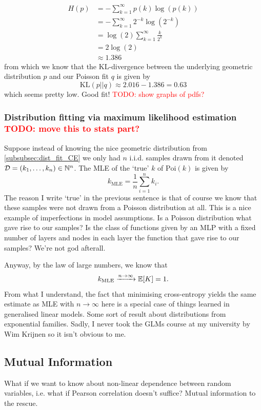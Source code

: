 \documentclass[11pt]{article}
\begin{document}
\begin{appendices}
\begin{align*}
    H(p)
    &=
    -\sum_{k=1}^{\infty}p(k)\log(p(k))\\
    &=
    -\sum_{k=1}^{\infty}2^{-k}\log(2^{-k})\\
    &=
    \log(2)\sum_{k=1}^{\infty}\frac{k}{2^k}\\
    &=
    2\log(2)\\
    &\approx
    1.386
\end{align*}
from which we know that the KL-divergence between the underlying geometric distribution $p$ and our Poisson fit $q$ is given by
$$
\text{KL}(p||q)
\approx
2.016-1.386
=
0.63
$$
which seems pretty low. Good fit! \textcolor{red}{TODO: show graphs of pdfs?}

\subsubsection{Distribution fitting via maximum likelihood estimation \textcolor{red}{TODO: move this to stats part?}}
Suppose instead of knowing the nice geometric distribution from \autoref{subsubsec:dist_fit_CE} we only had $n$ i.i.d. samples drawn from it denoted $\mathcal{D}=(k_1,\dots,k_n)\in\mathbb{N}^n$. The MLE of the `true' $k$ of $\text{Poi}(k)$ is given by
$$
k_{\text{MLE}}
=
\frac{1}{n}\sum_{i=1}^n k_i.
$$
The reason I write `true' in the previous sentence is that of course we know that these samples were not drawn from a Poisson distribution at all. This is a nice example of imperfections in model assumptions. Is a Poisson distribution what gave rise to our samples? Is the class of functions given by an MLP with a fixed number of layers and nodes in each layer the function that gave rise to our samples? We're not god afterall.

Anyway, by the law of large numbers, we know that
$$
k_{\text{MLE}}\xrightarrow{n\to\infty}\mathbb{E}[K]=1.
$$
From what I understand, the fact that minimising cross-entropy yields the same estimate as MLE with $n\to\infty$ here is a special case of things learned in generalised linear models. Some sort of result about distributions from exponential families. Sadly, I never took the GLMs course at my university by Wim Krijnen so it isn't obvious to me.

\subsection{Mutual Information}
What if we want to know about non-linear dependence between random variables, i.e. what if Pearson correlation doesn't suffice? Mutual information to the rescue.


\end{appendices}
\end{document}
